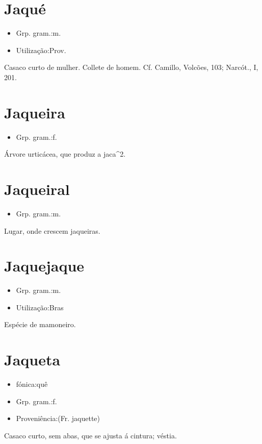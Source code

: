 \documentclass{article}
\begin{document}
\section{Jaqué}
\begin{itemize}
\item {Grp. gram.:m.}
\end{itemize}
\begin{itemize}
\item {Utilização:Prov.}
\end{itemize}
Casaco curto de mulher.
Collete de homem. Cf. Camillo, \textunderscore Volcões\textunderscore , 103; \textunderscore Narcót.\textunderscore , I, 201.
\section{Jaqueira}
\begin{itemize}
\item {Grp. gram.:f.}
\end{itemize}
Árvore urticácea, que produz a jaca^2.
\section{Jaqueiral}
\begin{itemize}
\item {Grp. gram.:m.}
\end{itemize}
Lugar, onde crescem jaqueiras.
\section{Jaquejaque}
\begin{itemize}
\item {Grp. gram.:m.}
\end{itemize}
\begin{itemize}
\item {Utilização:Bras}
\end{itemize}
Espécie de mamoneiro.
\section{Jaqueta}
\begin{itemize}
\item {fónica:quê}
\end{itemize}
\begin{itemize}
\item {Grp. gram.:f.}
\end{itemize}
\begin{itemize}
\item {Proveniência:(Fr. \textunderscore jaquette\textunderscore )}
\end{itemize}
Casaco curto, sem abas, que se ajusta á cintura; véstia.
\end{document}
